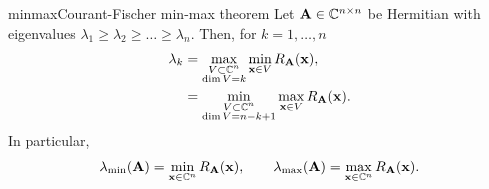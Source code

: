 \begin{Theorem*}{minmax}{Courant-Fischer min-max theorem}
  Let $\mathbf A\in\mathbb C^{n\times n}$ be Hermitian with eigenvalues
  $\lambda_1 \ge \lambda_2\ge\dots\ge \lambda_n$. Then, for $k=1,\dots,n$
  \begin{align}
    \lambda_k
    &= \max_{\substack{V \subset \mathbb C^n\\\dim V = k}} \min_{\mathbf x\in V} R_\mathbf A(\mathbf x),\\
    &= \min_{\substack{V \subset \mathbb C^n\\\dim V = n-k+1}} \max_{\mathbf x\in V} R_\mathbf A(\mathbf x).
  \end{align}
  In particular,
  \begin{gather}
    \lambda_{\min}(\mathbf A) = \min_{\mathbf x\in\mathbb C^n} R_\mathbf A(\mathbf x),
    \qquad
    \lambda_{\max}(\mathbf A) = \max_{\mathbf x\in\mathbb C^n} R_\mathbf A(\mathbf x).
  \end{gather}
\end{Theorem*}

